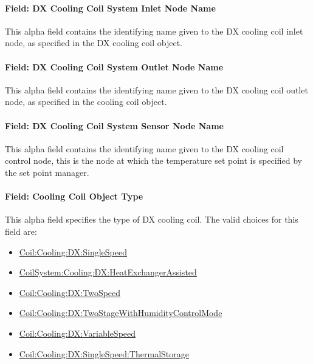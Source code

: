 \paragraph{Field: DX Cooling Coil System Inlet Node Name}\label{field-dx-cooling-coil-system-inlet-node-name}

This alpha field contains the identifying name given to the DX cooling coil inlet node, as specified in the DX cooling coil object.

\paragraph{Field: DX Cooling Coil System Outlet Node Name}\label{field-dx-cooling-coil-system-outlet-node-name}

This alpha field contains the identifying name given to the DX cooling coil outlet node, as specified in the cooling coil object.

\paragraph{Field: DX Cooling Coil System Sensor Node Name}\label{field-dx-cooling-coil-system-sensor-node-name}

This alpha field contains the identifying name given to the DX cooling coil control node, this is the node at which the temperature set point is specified by the set point manager.

\paragraph{Field: Cooling Coil Object Type}\label{field-cooling-coil-object-type-000}

This alpha field specifies the type of DX cooling coil. The valid choices for this field are:

\begin{itemize}
\item
  \hyperref[coilcoolingdxsinglespeed]{Coil:Cooling:DX:SingleSpeed}
\item
  \hyperref[coilsystemcoolingdxheatexchangerassisted]{CoilSystem:Cooling:DX:HeatExchangerAssisted}
\item
  \hyperref[coilcoolingdxtwospeed]{Coil:Cooling:DX:TwoSpeed}
\item
  \hyperref[coilcoolingdxtwostagewithhumiditycontrolmode]{Coil:Cooling:DX:TwoStageWithHumidityControlMode}
\item
  \hyperref[coilcoolingdxvariablespeed]{Coil:Cooling:DX:VariableSpeed}
\item
  \hyperref[coilcoolingdxsinglespeedthermalstorage]{Coil:Cooling:DX:SingleSpeed:ThermalStorage}
\end{itemize}


